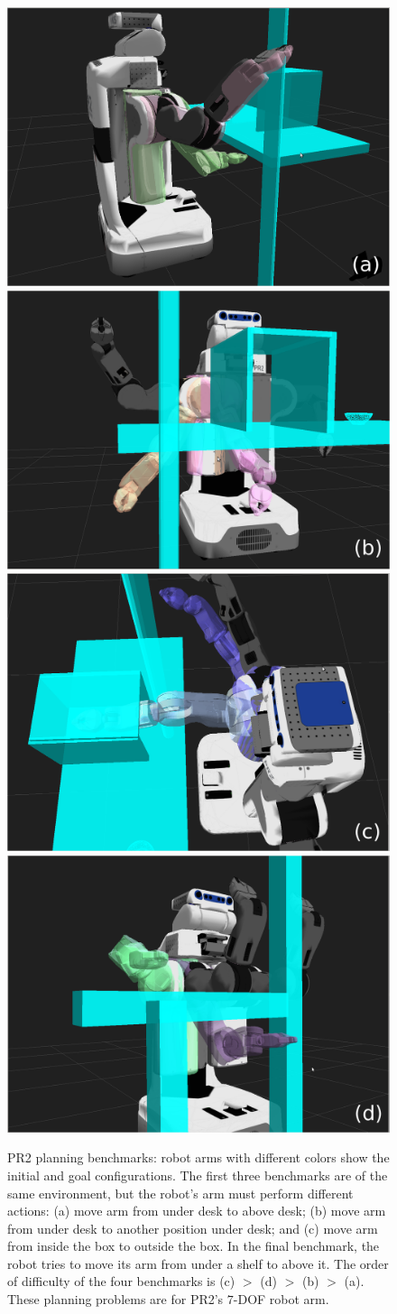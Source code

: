 \begin{figure}[h]
  \centering
  \includegraphics[width=0.24\linewidth]{figs/3/benchmark1.png}
  \includegraphics[width=0.24\linewidth]{figs/3/benchmark2.png}
  \includegraphics[width=0.24\linewidth]{figs/3/benchmark3.png}
  \includegraphics[width=0.24\linewidth]{figs/3/benchmark4.png}
  \caption[PR2 planning benchmarks for instance-based learning]{\label{fig:3:benchmark} PR2 planning benchmarks: robot arms with different colors show the initial and goal configurations. The first three benchmarks are of the same environment, but the robot's arm must perform different actions: (a) move arm from under desk to above desk; (b) move arm from under desk to another position under desk; and (c) move arm from inside the box to outside the box. In the final benchmark, the robot tries to move its arm from under a shelf to above it. The order of difficulty of the four benchmarks is (c) $>$ (d) $>$ (b) $>$ (a). These planning problems are for PR2's $7$-DOF robot arm.}
\end{figure}

